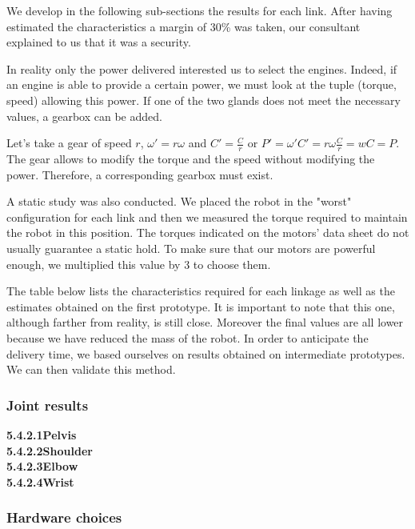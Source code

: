 \bigbreak
We develop in the following sub-sections the results for each link. After having estimated the characteristics a margin of 30\% was taken, our consultant explained to us that it was a security. 

\bigbreak
In reality only the power delivered interested us to select the engines. Indeed, if an engine is able to provide a certain power, we must look at the tuple (torque, speed) allowing this power. If one of the two glands does not meet the necessary values, a gearbox can be added. 

\bigbreak
Let's take a gear of speed $r$, $\omega'= r\omega$ and $C'= \frac{C}{r}$ or $P'= \omega'C'=r\omega\frac{C}{r} = wC = P$. The gear allows to modify the torque and the speed without modifying the power. Therefore, a corresponding gearbox must exist.

\bigbreak
A static study was also conducted. We placed the robot in the "worst" configuration for each link and then we measured the torque required to maintain the robot in this position. The torques indicated on the motors' data sheet do not usually guarantee a static hold. To make sure that our motors are powerful enough, we multiplied this value by 3 to choose them. 

\bigbreak
The table below lists the characteristics required for each linkage as well as the estimates obtained on the first prototype. It is important to note that this one, although farther from reality, is still close. Moreover the final values are all lower because we have reduced the mass of the robot. In order to anticipate the delivery time, we based ourselves on results obtained on intermediate prototypes. We can then validate this method. 

\subsubsection{Joint results}
\textbf{5.4.2.1}\hspace*{0.3cm}\textbf{Pelvis}\\

\textbf{5.4.2.2}\hspace*{0.3cm}\textbf{Shoulder}\\

\textbf{5.4.2.3}\hspace*{0.3cm}\textbf{Elbow}\\

\textbf{5.4.2.4}\hspace*{0.3cm}\textbf{Wrist}\\

\subsubsection{Hardware choices}